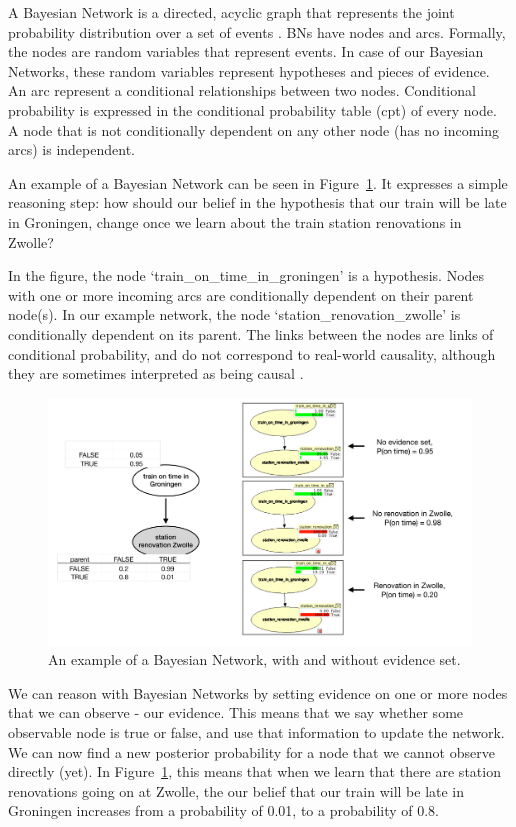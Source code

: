 A Bayesian Network is a directed, acyclic graph that represents the joint probability distribution over a set of events \citep{pearl1988}. BNs have nodes and arcs. Formally, the nodes are random variables that represent events. In case of our Bayesian Networks, these random variables represent hypotheses and pieces of evidence. An arc represent a conditional relationships between two nodes. Conditional probability is expressed in the conditional probability table (cpt) of every node. A node that is not conditionally dependent on any other node (has no incoming arcs) is independent. 

 An example of a Bayesian Network can be seen in Figure~\ref{exampleBN}. It expresses a simple reasoning step: how should our belief in the hypothesis that our train will be late in Groningen, change once we learn about the train station renovations in Zwolle?
 
In the figure, the node `train\_on\_time\_in\_groningen' is a hypothesis. Nodes with one or more incoming arcs are conditionally dependent on their parent node(s). In our example network, the node `station\_renovation\_zwolle' is conditionally dependent on its parent. The links between the nodes are links of conditional probability, and do not correspond to real-world causality, although they are sometimes interpreted as being causal \citep{Dawid2008}.

\begin{figure}[h]
\includegraphics[width=\linewidth]{images/bnExample.pdf}
\caption{An example of a Bayesian Network, with and without evidence set.}
\label{exampleBN}
\end{figure}

We can reason with Bayesian Networks by setting evidence on one or more nodes that we can observe - our evidence. This means that we say whether some observable node is true or false, and use that information to update the network. We can now find a new posterior probability for a node that we cannot observe directly (yet). In Figure~\ref{exampleBN}, this means that when we learn that there are station renovations going on at Zwolle, the our belief that our train will be late in Groningen increases from a probability of 0.01, to a probability of 0.8. 

